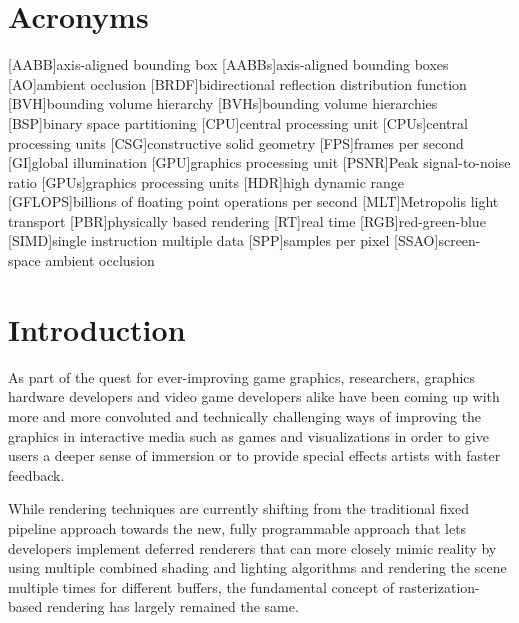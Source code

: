 \documentclass[
  twoside,
  11pt, a4paper,
  footinclude=true,
  headinclude=true,
  cleardoublepage=empty
]{scrreprt}
\begin{document}
{\small \tableofcontents}

\chapter*{Acronyms}
\begin{acronym}
    [AABB]{axis-aligned bounding box}
    [AABBs]{axis-aligned bounding boxes}
    [AO]{ambient occlusion}
    [BRDF]{bidirectional reflection distribution function}
    [BVH]{bounding volume hierarchy}
    [BVHs]{bounding volume hierarchies}
    [BSP]{binary space partitioning}
    [CPU]{central processing unit}
    [CPUs]{central processing units}
    [CSG]{constructive solid geometry}
    [FPS]{frames per second}
    [GI]{global illumination}
    [GPU]{graphics processing unit}
    [PSNR]{Peak signal-to-noise ratio}
    [GPUs]{graphics processing units}
    [HDR]{high dynamic range}
    [GFLOPS]{billions of floating point operations per second}
    [MLT]{Metropolis light transport}
    [PBR]{physically based rendering}
    [RT]{real time}
    [RGB]{red-green-blue}
    [SIMD]{single instruction multiple data}
    [SPP]{samples per pixel}
    [SSAO]{screen-space ambient occlusion}
\end{acronym}

\chapter{Introduction}
\label{introduction}
As part of the quest for ever-improving game graphics, researchers, graphics hardware developers
and video game developers alike have been coming up with more and more convoluted and technically
challenging ways of improving the graphics in interactive media such as games and visualizations in
order to give users a deeper sense of immersion or to provide special effects artists with faster
feedback.

While rendering techniques are currently shifting from the traditional fixed pipeline approach
towards the new, fully programmable approach that lets developers implement deferred renderers that
can more closely mimic reality by using multiple combined shading and lighting algorithms and
rendering the scene multiple times for different buffers, the fundamental concept of
rasterization-based rendering has largely remained the same.
\end{document}
